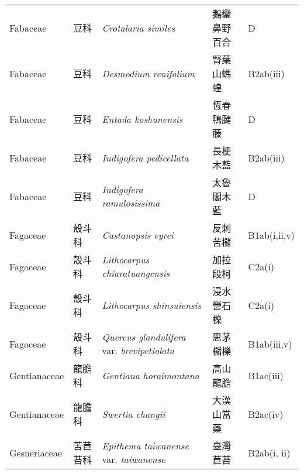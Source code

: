{\begin{longtable}{p{2.5cm}p{2.5cm}p{4.5cm}p{2.5cm}p{3cm}}
    Fabaceae & 豆科 & \textit{Crotalaria similes}  & 鵝鑾鼻野百合 & D \index{Crotalaria@\textit{Crotalaria}!similes@\textit{similes}}  \index{鵝鑾鼻野百合} \\
    Fabaceae & 豆科 & \textit{Desmodium renifolium}  & 腎葉山螞蝗 & B2ab(iii) \index{Desmodium@\textit{Desmodium}!renifolium@\textit{renifolium}}  \index{腎葉山螞蝗} \\
    Fabaceae & 豆科 & \textit{Entada koshunensis}  & 恆春鴨腱藤 & D \index{Entada@\textit{Entada}!koshunensis@\textit{koshunensis}}  \index{恆春鴨腱藤} \\
    Fabaceae & 豆科 & \textit{Indigofera pedicellata}  & 長梗木藍 & B2ab(iii) \index{Indigofera@\textit{Indigofera}!pedicellata@\textit{pedicellata}}  \index{長梗木藍} \\
    Fabaceae & 豆科 & \textit{Indigofera ramulosissima}  & 太魯閣木藍 & D \index{Indigofera@\textit{Indigofera}!ramulosissima@\textit{ramulosissima}}  \index{太魯閣木藍} \\
    Fagaceae & 殼斗科 & \textit{Castanopsis eyrei}  & 反刺苦櫧 & B1ab(i,ii,v) \index{Castanopsis@\textit{Castanopsis}!eyrei@\textit{eyrei}}  \index{反刺苦櫧} \\
    Fagaceae & 殼斗科 & \textit{Lithocarpus chiaratuangensis}  & 加拉段柯 & C2a(i) \index{Lithocarpus@\textit{Lithocarpus}!chiaratuangensis@\textit{chiaratuangensis}}  \index{加拉段柯} \\
    Fagaceae & 殼斗科 & \textit{Lithocarpus shinsuiensis}  & 浸水營石櫟 & C2a(i) \index{Lithocarpus@\textit{Lithocarpus}!shinsuiensis@\textit{shinsuiensis}}  \index{浸水營石櫟} \\
    Fagaceae & 殼斗科 & \textit{Quercus glandulifera} var. \textit{brevipetiolata}  & 思茅櫧櫟 & B1ab(iii,v) \index{Quercus@\textit{Quercus}!glandulifera@\textit{glandulifera}!var. brevipetiolata@var. \textit{brevipetiolata}}  \index{思茅櫧櫟} \\
    Gentianaceae & 龍膽科 & \textit{Gentiana horaimontana}  & 高山龍膽 & B1ac(iii) \index{Gentiana@\textit{Gentiana}!horaimontana@\textit{horaimontana}}  \index{高山龍膽} \\
    Gentianaceae & 龍膽科 & \textit{Swertia changii}  & 大漢山當藥 & B2ac(iv) \index{Swertia@\textit{Swertia}!changii@\textit{changii}}  \index{大漢山當藥} \\
    Gesneriaceae & 苦苣苔科 & \textit{Epithema taiwanense} var. \textit{taiwanense}  & 臺灣苣苔 & B2ab(i, ii) \index{Epithema@\textit{Epithema}!taiwanense@\textit{taiwanense}!var. taiwanense@var. \textit{taiwanense}}  \index{臺灣苣苔} \\

\end{longtable}}
